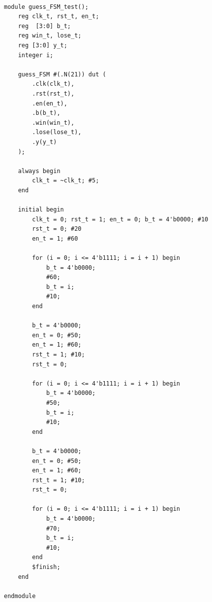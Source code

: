 \documentclass[11pt]{article}
\begin{document}
\begin{lstlisting}

module guess_FSM_test();
	reg clk_t, rst_t, en_t;
	reg  [3:0] b_t;
	reg win_t, lose_t;
	reg [3:0] y_t;
	integer i;

	guess_FSM #(.N(21)) dut (
		.clk(clk_t), 
		.rst(rst_t), 
		.en(en_t),
		.b(b_t),
		.win(win_t), 
		.lose(lose_t), 
		.y(y_t)
	);

	always begin
		clk_t = ~clk_t; #5;
	end

	initial begin
		clk_t = 0; rst_t = 1; en_t = 0; b_t = 4'b0000; #10
		rst_t = 0; #20
		en_t = 1; #60

		for (i = 0; i <= 4'b1111; i = i + 1) begin
			b_t = 4'b0000; 
			#60; 
			b_t = i;
			#10;
		end

		b_t = 4'b0000;
		en_t = 0; #50;
		en_t = 1; #60; 
		rst_t = 1; #10;
		rst_t = 0;

		for (i = 0; i <= 4'b1111; i = i + 1) begin
			b_t = 4'b0000;
			#50; 
			b_t = i;
			#10; 
		end 

		b_t = 4'b0000;
		en_t = 0; #50;
		en_t = 1; #60; 
		rst_t = 1; #10;
		rst_t = 0;

		for (i = 0; i <= 4'b1111; i = i + 1) begin
			b_t = 4'b0000;
			#70; 
			b_t = i;
			#10; 
		end 
		$finish;
	end

endmodule

\end{lstlisting}
\end{document}
